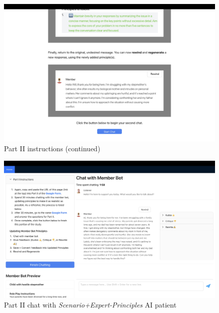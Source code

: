 \documentclass[11pt]{article}
\begin{document}
\begin{figure}[ht]
    \centering
    \includegraphics[width=\textwidth]{Study Screenshots/Screen8.jpeg}
    \caption{Part II instructions (continued)}
    \label{fig:screen8}
\end{figure}

\begin{figure}[ht]
    \centering
    \includegraphics[width=\textwidth]{Study Screenshots/Screen10.jpeg}
    \caption{Part II chat with \textit{Scenario+Expert-Principles} AI patient}
    \label{fig:screen10}
\end{figure}
\end{document}

